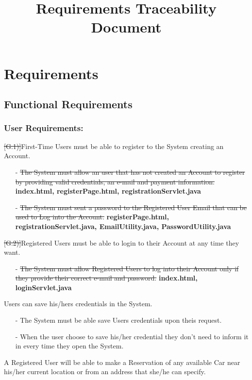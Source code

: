 \documentclass[a4paper]{article}
\title{Requirements Traceability Document}
\begin{document}
\section{Requirements}
\subsection{Functional Requirements}
\subsubsection{\textbf{User Requirements:}}
\begin{description}
\item \sout{[G.1)]}First-Time Users must be able to register to the System creating an Account. 
\begin{itemize}
	\item[-]\sout{The System must allow an user that has not created an Account to register by providing valid credentials, an e-mail and payment information.}
	\textbf{index.html, registerPage.html, registrationServlet.java}
	\item[-]\sout{The System must sent a password to the Registered User Email that can be used to Log into the Account.}
	\textbf{registerPage.html, registrationServlet.java, EmailUtility.java, PasswordUtility.java}
\end{itemize}
\item \sout{[G.2)]}Registered Users must be able to login to their Account at any time they want.
\begin{itemize}
	\item[-]\sout{The System must allow Registered Users to log into their Account only if they provide their correct e-mail and password.}
	\textbf{index.html, loginServlet.java}
\end{itemize}
\item [G.3)]Users can save his/hers credentials in the System.
\begin{itemize}
	\item[-]The System must be able save Users credentials upon theis request.
	\item[-]When the user choose to save his/her credential they don't need to inform it in every time they open the System.
\end{itemize}
\item [G.4)]A Registered User will be able to make a Reservation of any available Car near his/her current location or from an address that she/he can specify.
\begin{itemize}

\end{itemize}
\end{description}
\end{document}
